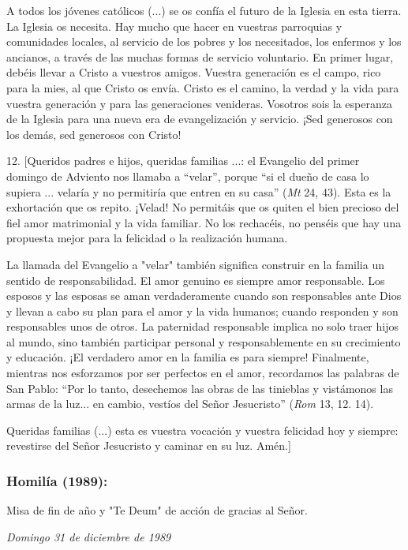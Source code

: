 A todos los jóvenes católicos (...) se os confía el futuro de la Iglesia
en esta tierra. La Iglesia os necesita. Hay mucho que hacer en vuestras
parroquias y comunidades locales, al servicio de los pobres y los
necesitados, los enfermos y los ancianos, a través de las muchas formas
de servicio voluntario. En primer lugar, debéis llevar a Cristo a
vuestros amigos. Vuestra generación es el campo, rico para la mies, al
que Cristo os envía. Cristo es el camino, la verdad y la vida para
vuestra generación y para las generaciones venideras. Vosotros sois la
esperanza de la Iglesia para una nueva era de evangelización y servicio.
¡Sed generosos con los demás, sed generosos con Cristo!

12. {[}Queridos padres e hijos, queridas familias ...: el Evangelio del
primer domingo de Adviento nos llamaba a ``velar'', porque ``si el dueño
de casa lo supiera ... velaría y no permitiría que entren en su casa''
(\emph{Mt} 24, 43). Esta es la exhortación que os repito. ¡Velad! No
permitáis que os quiten el bien precioso del fiel amor matrimonial y la
vida familiar. No los rechacéis, no penséis que hay una propuesta mejor
para la felicidad o la realización humana.

La llamada del Evangelio a "velar" también significa construir en la
familia un sentido de responsabilidad. El amor genuino es siempre amor
responsable. Los esposos y las esposas se aman verdaderamente cuando son
responsables ante Dios y llevan a cabo su plan para el amor y la vida
humanos; cuando responden y son responsables unos de otros. La
paternidad responsable implica no solo traer hijos al mundo, sino
también participar personal y responsablemente en su crecimiento y
educación. ¡El verdadero amor en la familia es para siempre! Finalmente,
mientras nos esforzamos por ser perfectos en el amor, recordamos las
palabras de San Pablo: ``Por lo tanto, desechemos las obras de las
tinieblas y vistámonos las armas de la luz... en cambio, vestíos del
Señor Jesucristo'' (\emph{Rom} 13, 12. 14).

Queridas familias (...) esta es vuestra vocación y vuestra felicidad hoy
y siempre: revestirse del Señor Jesucristo y caminar en su luz. Amén.{]}

\subsubsection{Homilía (1989): }
Misa de fin de año y "Te Deum" de acción de gracias al Señor.

\emph{Domingo 31 de diciembre de 1989}

